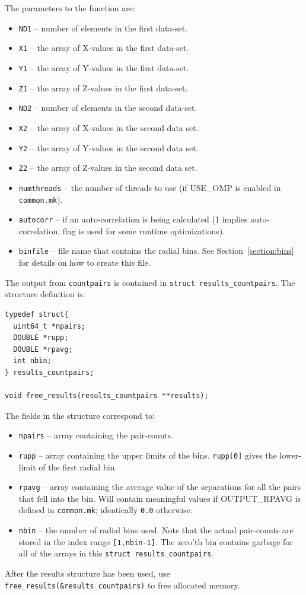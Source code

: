 \documentclass[12pt,titlepage]{article}
\newcommand{\xir}{\ensuremath{{\xi(r)}}\xspace}
\begin{document}
The parameters to the function are:
\begin{itemize}
\item \texttt{ND1} -- number of elements in the first data-set.
\item \texttt{X1}  -- the array of X-values in the first data-set.
\item \texttt{Y1}  -- the array of Y-values in the first data-set.
\item \texttt{Z1}  -- the array of Z-values in the first data-set.
\item \texttt{ND2} -- number of elements in the second data-set.
\item \texttt{X2}  -- the array of X-values in the second data set.
\item \texttt{Y2}  -- the array of Y-values in the second data set.
\item \texttt{Z2}  -- the array of Z-values in the second data set.
\item \texttt{numthreads} -- the number of threads to use (if USE\_OMP is enabled in \texttt{common.mk}).
\item \texttt{autocorr} -- if an auto-correlation is being calculated (1 implies auto-correlation, flag is used for some runtime optimizations).
\item \texttt{binfile} -- file name that contains the radial bins. See Section~\ref{section:bins} for details on how to create this file.
\end{itemize}

The output from \texttt{countpairs} is contained in \texttt{struct results\_countpairs}. The structure
definition is:
\begin{lstlisting}[label={code:API_DD_struct},caption={Structure definition for the output of \xir.}]
typedef struct{
  uint64_t *npairs;
  DOUBLE *rupp;
  DOUBLE *rpavg;
  int nbin;
} results_countpairs;

void free_results(results_countpairs **results);
\end{lstlisting}

The fields in the structure correspond to:
\begin{itemize}
\item \texttt{npairs} -- array containing the pair-counts. 
\item \texttt{rupp}   -- array containing the upper limits of the bins. \texttt{rupp[0]} gives the lower-limit of the first radial bin. 
\item \texttt{rpavg}  -- array containing the average value of the separations for all the pairs that fell into the bin. Will contain 
meaningful values if OUTPUT\_RPAVG is defined in \texttt{common.mk}; identically \texttt{0.0} otherwise. 
\item \texttt{nbin}   -- the number of radial bins used. Note that the actual pair-counts are stored in the index range \texttt{[1,nbin-1]}. The
zero'th bin contains garbage for all of the arrays in this \texttt{struct results\_countpairs}.
\end{itemize}
After the results structure has been used, use \texttt{free\_results(\&results\_countpairs)} to free allocated memory. 
\end{document}
